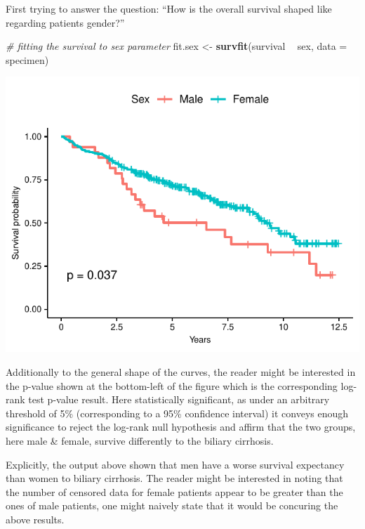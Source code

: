 \documentclass[]{article}
\newenvironment{Shaded}{\begin{snugshade}}{\end{snugshade}}
\newcommand{\KeywordTok}[1]{\textcolor[rgb]{0.13,0.29,0.53}{\textbf{#1}}}
\newcommand{\DataTypeTok}[1]{\textcolor[rgb]{0.13,0.29,0.53}{#1}}
\newcommand{\StringTok}[1]{\textcolor[rgb]{0.31,0.60,0.02}{#1}}
\newcommand{\CommentTok}[1]{\textcolor[rgb]{0.56,0.35,0.01}{\textit{#1}}}
\newcommand{\OperatorTok}[1]{\textcolor[rgb]{0.81,0.36,0.00}{\textbf{#1}}}
\newcommand{\NormalTok}[1]{#1}
\begin{document}
First trying to answer the question: ``How is the overall survival
shaped like regarding patients gender?''

\begin{Shaded}
\begin{Highlighting}[]
\CommentTok{# fitting the survival to sex parameter}
\NormalTok{fit.sex <-}\StringTok{ }\KeywordTok{survfit}\NormalTok{(survival }\OperatorTok{~}\StringTok{ }\NormalTok{sex, }\DataTypeTok{data =}\NormalTok{ specimen)}
\end{Highlighting}
\end{Shaded}

\includegraphics{survival_v5_files/figure-latex/unnamed-chunk-15-1.pdf}

Additionally to the general shape of the curves, the reader might be
interested in the p-value shown at the bottom-left of the figure which
is the corresponding log-rank test p-value result. Here statistically
significant, as under an arbitrary threshold of 5\% (corresponding to a
95\% confidence interval) it conveys enough significance to reject the
log-rank null hypothesis and affirm that the two groups, here male \&
female, survive differently to the biliary cirrhosis.

Explicitly, the output above shown that men have a worse survival
expectancy than women to biliary cirrhosis. The reader might be
interested in noting that the number of censored data for female
patients appear to be greater than the ones of male patients, one might
naively state that it would be concuring the above results.
\end{document}

